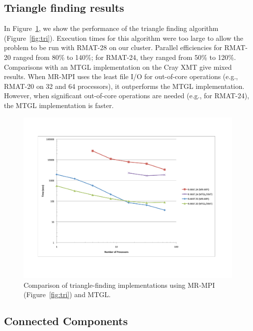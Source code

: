 \subsection{Triangle finding results}

In Figure~\ref{f:tri}, we show the performance of the triangle finding 
algorithm (Figure~\ref{fig:tri}).  Execution times for this algorithm were
too large to allow the problem to be run with RMAT-28 on our cluster.
Parallel efficiencies for RMAT-20 ranged from 80\% to 140\%; for RMAT-24, they
ranged from 50\% to 120\%.  Comparisons with an MTGL implementation on the 
Cray XMT give mixed results.  When MR-MPI uses the least file I/O for 
out-of-core operations (e.g., RMAT-20 on 32 and 64 processors), it 
outperforms the MTGL implementation.  However, when significant out-of-core
operations are needed (e.g., for RMAT-24), the MTGL implementation is faster.

\begin{figure}[htb]
\includegraphics[width=\textwidth]{fig_tri.pdf}
\caption{Comparison of triangle-finding implementations using
MR-MPI (Figure~\ref{fig:tri}) and MTGL.}
\label{f:tri}
\end{figure}

\subsection{Connected Components}

